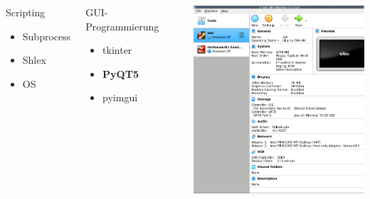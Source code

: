 \documentclass{beamer}
\begin{document}
\begin{frame}
\begin{center}
\begin{columns}[onlytextwidth,T]
\column{\dimexpr\linewidth-65mm-5mm}
\begin{block}{Scripting}
\begin{itemize}
\item Subprocess
\item Shlex
\item OS
\end{itemize}
\end{block}
\pause
\begin{block}{GUI-Programmierung}
\begin{itemize}
\item tkinter
\item \textbf{PyQT5}
\item pyimgui
\end{itemize}
\end{block}
\pause
\column{65mm}
\includegraphics[width=65mm]{./assets/vb.png}
\end{columns}
\end{center}
\end{frame}
\end{document}
